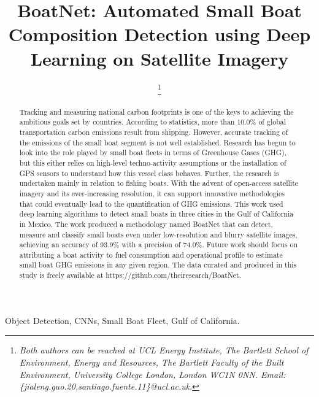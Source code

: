 \documentclass[lettersize,journal]{IEEEtran}
\begin{document}
\title{BoatNet: Automated Small Boat Composition Detection using Deep Learning on Satellite Imagery}

\author{

\thanks{\textit{
Both authors can be reached at UCL Energy Institute, The Bartlett School of Environment, Energy and Resources, The Bartlett Faculty of the Built Environment, University College London, London WC1N 0NN. Email: \{jialeng.guo.20,santiago.fuente.11\}@ucl.ac.uk}.} 
}



\maketitle

\begin{abstract}
Tracking and measuring national carbon footprints is one of the keys to achieving the ambitious goals set by countries. According to statistics, more than 10.0\% of global transportation carbon emissions result from shipping. However, accurate tracking of the emissions of the small boat segment is not well established. Research has begun to look into the role played by small boat fleets in terms of Greenhouse Gases (GHG), but this either relies on high-level techno-activity assumptions or the installation of GPS sensors to understand how this vessel class behaves. Further, the research is undertaken mainly in relation to fishing boats. With the advent of open-access satellite imagery and its ever-increasing resolution, it can support innovative methodologies that could eventually lead to the quantification of GHG emissions. This work used deep learning algorithms to detect small boats in three cities in the Gulf of California in Mexico. The work produced a methodology named BoatNet that can detect, measure and classify small boats even under low-resolution and blurry satellite images, achieving an accuracy of 93.9\% with a precision of 74.0\%. Future work should focus on attributing a boat activity to fuel consumption and operational profile to estimate small boat GHG emissions in any given region. The data curated and produced in this study is freely available at https://github.com/theiresearch/BoatNet.
\end{abstract}


\begin{IEEEkeywords}
Object Detection, CNNs, Small Boat Fleet, Gulf of California.
\end{IEEEkeywords}
\end{document}
